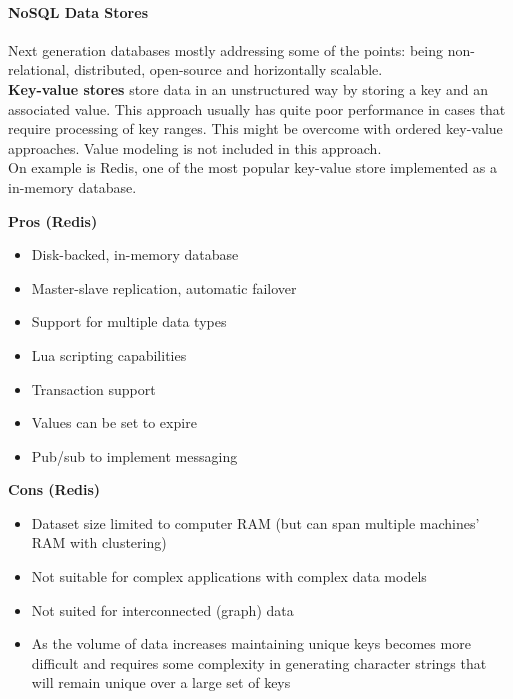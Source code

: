 \paragraph{NoSQL Data Stores}
Next generation databases mostly addressing some of the points: being non- relational, distributed, open-source and horizontally scalable.\\

\textbf{Key-value stores} store data in an unstructured way by storing a key and an associated value.
This approach usually has quite poor performance in cases that require processing of key ranges.
This might be overcome with ordered key-value approaches.
Value modeling is not included in this approach.\\
On example is Redis, one of the most popular key-value store implemented as a in-memory database.
\begin{minipage}[t]{0.49\textwidth}
  \textbf{Pros (Redis)}
  \begin{itemize}[topsep=0pt,noitemsep]
    \item Disk-backed, in-memory database
    \item Master-slave replication, automatic failover
    \item Support for multiple data types
    \item Lua scripting capabilities
    \item Transaction support
    \item Values can be set to expire
    \item Pub/sub to implement messaging
  \end{itemize}
\end{minipage}
\begin{minipage}[t]{0.49\textwidth}
  \textbf{Cons (Redis)}
  \begin{itemize}[topsep=0pt, noitemsep]
    \item Dataset size limited to computer RAM (but can span multiple machines' RAM with clustering)
    \item Not suitable for complex applications with complex data models
    \item Not suited for interconnected (graph) data
    \item As the volume of data increases maintaining unique keys becomes more difficult and requires some complexity in generating character strings that will remain unique over a large set of keys
  \end{itemize}
\end{minipage}
\vspace{20pt}

